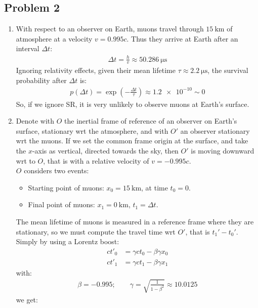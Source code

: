 \documentclass[../template.tex]{subfiles}
\begin{document}
\subsection{Problem 2}
\begin{enumerate}
    \item With respect to an observer on Earth, muons travel through $\SI{15}{\kilo\m}$ of atmosphere at a velocity $v = 0.995c$. Thus they arrive at Earth after an interval $\Delta t$:
    \begin{align*}
        \Delta t = \frac{h}{v} \approx \SI{50.286}{\micro\s} 
    \end{align*}  
    Ignoring relativity effects, given their mean lifetime $\tau \approx \SI{2.2}{\micro\s}$, the survival probability after $\Delta t$ is:
    \begin{align*}
        p(\Delta t) = \exp\left(-\frac{\Delta t}{\tau} \right)\approx \num{1.2e-10} \sim 0
    \end{align*}
    So, if we ignore SR, it is very unlikely to observe muons at Earth's surface.
    \item Denote with $O$ the inertial frame of reference of an observer on Earth's surface, stationary wrt the atmosphere, and with $O'$ an observer stationary wrt the muons. If we set the common frame origin at the surface, and take the $x$-axis as vertical, directed towards the sky, then $O'$ is moving downward wrt to $O$, that is with a relative velocity of $v = -0.995c$.\\
    $O$ considers two events:
    \begin{itemize}
        \item Starting point of muons: $x_0 = \SI{15}{\kilo\m}$, at time $t_0 = 0$.
        \item Final point of muons: $x_1 = \SI{0}{\kilo\m}$, $t_1 = \Delta t$.
    \end{itemize}
    The mean lifetime of muons is measured in a reference frame where they are stationary, so we must compute the travel time wrt $O'$, that is $t_1' - t_0'$. Simply by using a Lorentz boost:
    \begin{align*}
        ct'_0 &= \gamma ct_0  - \beta \gamma x_0  \\
        ct'_1 &= \gamma ct_1 - \beta \gamma x_1 
    \end{align*} 
    with:
    \begin{align*}
        \beta = -0.995; \qquad \gamma = \sqrt{\frac{1}{1-\beta^2} } \approx \num{10.0125}
    \end{align*} 
    we get:

\end{enumerate}
\end{document}
